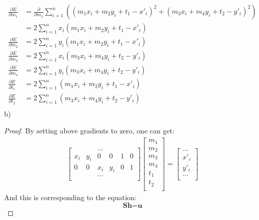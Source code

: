 \documentclass[letterpaper, 11pt]{article}
\begin{document}
\begin{align*}
    \frac{\partial E}{\partial m_1} & =\frac{\partial}{\partial m_1}\sum_{i=1}^{n} ((m_1 x_i+m_2 y_i+t_1-x'_i)^2+(m_3 x_i+m_4 y_i+t_2-y'_i)^2) \\
                                    & =2\sum_{i=1}^{n}x_i(m_1 x_i+m_2 y_i+t_1-x'_i)                                                            \\
    \frac{\partial E}{\partial m_2} & =2\sum_{i=1}^{n}y_i(m_1 x_i+m_2 y_i+t_1-x'_i)                                                            \\
    \frac{\partial E}{\partial m_3} & =2\sum_{i=1}^{n}x_i(m_3 x_i+m_4 y_i+t_2-y'_i)                                                            \\
    \frac{\partial E}{\partial m_4} & =2\sum_{i=1}^{n}y_i(m_3 x_i+m_4 y_i+t_2-y'_i)                                                            \\
    \frac{\partial E}{\partial t_1} & =2\sum_{i=1}^{n}(m_1 x_i+m_2 y_i+t_1-x'_i)                                                               \\
    \frac{\partial E}{\partial t_2} & =2\sum_{i=1}^{n}(m_3 x_i+m_4 y_i+t_2-y'_i)                                                               \\
\end{align*}
\newpage
b)
\begin{proof}
    By setting above gradients to zero, one can get:\\
    \begin{align*}
        \begin{bmatrix}
                &     & \ldots               \\
            x_i & y_i & 0      & 0   & 1 & 0 \\
            0   & 0   & x_i    & y_i & 0 & 1 \\
                &     & \ldots               \\
        \end{bmatrix}
        \begin{bmatrix}
            m_1 \\
            m_2 \\
            m_3 \\
            m_4 \\
            t_1 \\
            t_2 \\
        \end{bmatrix}
        =
        \begin{bmatrix}
            \ldots \\
            x'_i   \\
            y'_i   \\
            \ldots \\
        \end{bmatrix}
    \end{align*}
    And this is corresponding to the equation:
    $$\textbf{S}\textbf{h}=\textbf{u}$$
\end{proof}
\end{document}
